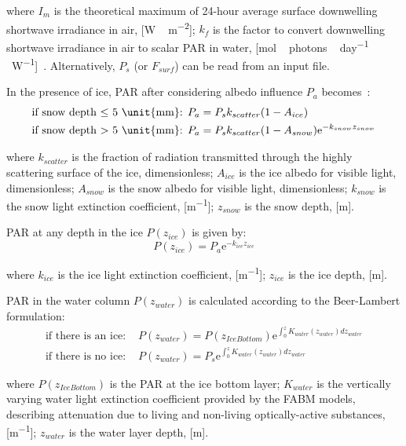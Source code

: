 \documentclass[gmd, manuscript]{copernicus}
\begin{document}
where $I_{m}$ is the theoretical maximum of 24-hour average surface downwelling shortwave irradiance in air, [\unit{W\,m^{-2}}];
$k_{f}$ is the factor to convert downwelling shortwave irradiance in air to scalar \textrm{PAR} in water, [\unit{mol\,photons\,day^{-1}\,W^{-1}}]~\citep{Mobley2012}.
Alternatively, $P_{s}$ (or $F_{surf}$) can be read from an input file.

In the presence of ice, \textrm{PAR} after considering albedo influence $P_{a}$ becomes~\citep{Light2008}:
\begin{align}
    \text{if snow depth $\le$ 5 \unit{mm}: } &P_{a} =
    P_{s} k_{scatter} (1 - A_{ice}) \\
    \text{if snow depth $>$   5 \unit{mm}: } &P_{a} =
    P_{s} k_{scatter} (1 - A_{snow}) \mathrm{e}^{-k_{snow} z_{snow}}
\end{align}

where $k_{scatter}$ is the fraction of radiation transmitted through the highly scattering surface of the ice, dimensionless;
$A_{ice}$ is the ice albedo for visible light, dimensionless;
$A_{snow}$ is the snow albedo for visible light, dimensionless;
$k_{snow}$ is the snow light extinction coefficient, [\unit{m^{-1}}];
$z_{snow}$ is the snow depth, [\unit{m}].

\textrm{PAR} at any depth in the ice $P(z_{ice})$ is given by:
\begin{equation}
    P(z_{ice}) = P_{a} \mathrm{e}^{-k_{ice} z_{ice}}
\end{equation}

where $k_{ice}$ is the ice light extinction coefficient, [\unit{m^{-1}}];
$z_{ice}$ is the ice depth, [\unit{m}].

\textrm{PAR} in the water column $P(z_{water})$ is calculated according to the Beer-Lambert formulation:
\begin{align}
    \text{if there is an ice: } &P(z_{water}) =
    P(z_{IceBottom}) \mathrm{e}^{\int_{0}^{z} K_{water}(z_{water}) dz_{water}} \\
    \text{if there is no ice: } &P(z_{water}) =
    P_{s} \mathrm{e}^{\int_{0}^{z} K_{water}(z_{water}) dz_{water}}
\end{align}

where $P(z_{IceBottom})$ is the \textrm{PAR} at the ice bottom layer;
$K_{water}$ is the vertically varying water light extinction coefficient provided by the \textrm{FABM} models, describing attenuation due to living and non-living optically-active substances, [\unit{m^{-1}}];
$z_{water}$ is the water layer depth, [\unit{m}].
\end{document}
